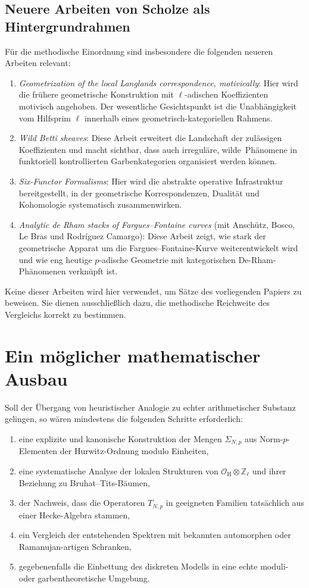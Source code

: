 \documentclass[12pt,a4paper]{article}
\theoremstyle{plain}
\theoremstyle{definition}
\theoremstyle{remark}
\newcommand{\Z}{\mathbb{Z}}
\newcommand{\OH}{\mathcal{O}_{\mathrm H}}
\newcommand{\SNp}{\Sigma_{N,p}}
\newcommand{\TNp}{T_{N,p}}
\begin{document}
\subsection*{Neuere Arbeiten von Scholze als Hintergrundrahmen}
Für die methodische Einordnung sind insbesondere die folgenden neueren Arbeiten relevant:
\begin{enumerate}[label=\arabic*.]
\item \emph{Geometrization of the local Langlands correspondence, motivically}: Hier wird die frühere geometrische Konstruktion mit \(\ell\)-adischen Koeffizienten motivisch angehoben. Der wesentliche Gesichtspunkt ist die Unabhängigkeit vom Hilfsprim \(\ell\) innerhalb eines geometrisch-kategoriellen Rahmens.
\item \emph{Wild Betti sheaves}: Diese Arbeit erweitert die Landschaft der zulässigen Koeffizienten und macht sichtbar, dass auch irreguläre, \glqq wilde\grqq\ Phänomene in funktoriell kontrollierten Garbenkategorien organisiert werden können.
\item \emph{Six-Functor Formalisms}: Hier wird die abstrakte operative Infrastruktur bereitgestellt, in der geometrische Korrespondenzen, Dualität und Kohomologie systematisch zusammenwirken.
\item \emph{Analytic de Rham stacks of Fargues--Fontaine curves} (mit Anschütz, Bosco, Le Bras und Rodríguez Camargo): Diese Arbeit zeigt, wie stark der geometrische Apparat um die Fargues--Fontaine-Kurve weiterentwickelt wird und wie eng heutige \(p\)-adische Geometrie mit kategorischen De-Rham-Phänomenen verknüpft ist.
\end{enumerate}

Keine dieser Arbeiten wird hier verwendet, um Sätze des vorliegenden Papiers zu beweisen. Sie dienen ausschließlich dazu, die methodische Reichweite des Vergleichs korrekt zu bestimmen.

\section{Ein möglicher mathematischer Ausbau}
Soll der Übergang von heuristischer Analogie zu echter arithmetischer Substanz gelingen, so wären mindestens die folgenden Schritte erforderlich:
\begin{enumerate}[label=\arabic*.]
\item eine explizite und kanonische Konstruktion der Mengen \(\SNp\) aus Norm-\(p\)-Elementen der Hurwitz-Ordnung modulo Einheiten,
\item eine systematische Analyse der lokalen Strukturen von \(\OH\otimes \Z_\ell\) und ihrer Beziehung zu Bruhat--Tits-Bäumen,
\item der Nachweis, dass die Operatoren \(\TNp\) in geeigneten Familien tatsächlich aus einer Hecke-Algebra stammen,
\item ein Vergleich der entstehenden Spektren mit bekannten automorphen oder Ramanujan-artigen Schranken,
\item gegebenenfalls die Einbettung des diskreten Modells in eine echte moduli- oder garbentheoretische Umgebung.
\end{enumerate}
\end{document}
